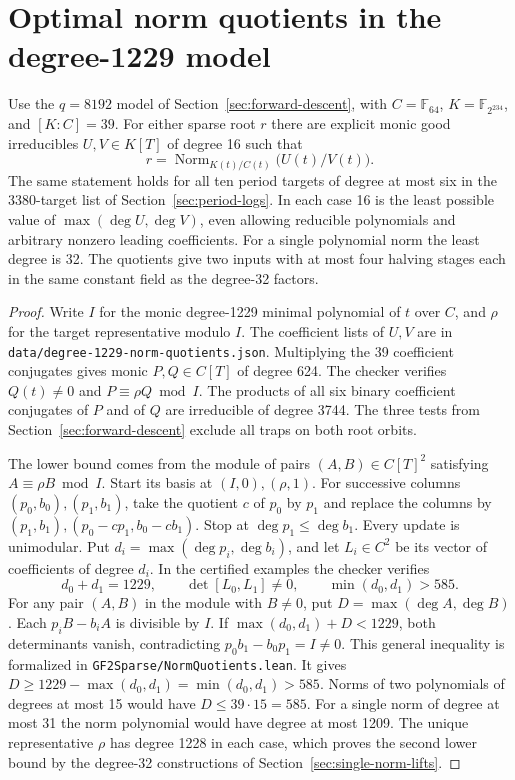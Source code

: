 \documentclass[11pt]{article}
\begin{document}
\section{Optimal norm quotients in the degree-1229 model}\label{sec:norm-quotients}
Use the \(q=8192\) model of Section~\ref{sec:forward-descent}, with
\(C=\mathbb F_{64}\), \(K=\mathbb F_{2^{234}}\), and \([K:C]=39\).
For either sparse root \(r\) there are explicit monic good irreducibles
\(U,V\in K[T]\) of degree 16 such that
\[
              r=\operatorname{Norm}_{K(t)/C(t)}\bigl(U(t)/V(t)\bigr).
\]
The same statement holds for all ten period targets of degree at most six
in the 3380-target list of Section~\ref{sec:period-logs}.
In each case 16 is the least possible value of
\(\max(\deg U,\deg V)\), even allowing reducible polynomials and arbitrary
nonzero leading coefficients. For a single polynomial norm the least
degree is 32. The quotients give two inputs with at most four halving
stages each in the same constant field as the degree-32 factors.

\begin{proof}
Write \(I\) for the monic degree-1229 minimal polynomial of \(t\) over
\(C\), and \(\rho\) for the target representative modulo \(I\).
The coefficient lists of \(U,V\) are in
\nolinkurl{data/degree-1229-norm-quotients.json}. Multiplying the
39 coefficient conjugates gives monic \(P,Q\in C[T]\) of degree 624.
The checker verifies \(Q(t)\ne0\) and \(P\equiv\rho Q\bmod I\).
The products of all six binary coefficient conjugates of \(P\) and of
\(Q\) are irreducible of degree 3744. The three tests from
Section~\ref{sec:forward-descent} exclude all traps on both root orbits.

The lower bound comes from the module of pairs
\((A,B)\in C[T]^2\) satisfying \(A\equiv\rho B\bmod I\).
Start its basis at \((I,0),(\rho,1)\). For successive columns
\((p_0,b_0),(p_1,b_1)\), take the quotient \(c\) of \(p_0\) by \(p_1\)
and replace the columns by
\((p_1,b_1),(p_0-cp_1,b_0-cb_1)\). Stop at
\(\deg p_1\le\deg b_1\). Every update is unimodular.
Put \(d_i=\max(\deg p_i,\deg b_i)\), and let \(L_i\in C^2\)
be its vector of coefficients of degree \(d_i\). In the certified
examples the checker verifies
\[
  d_0+d_1=1229,\qquad \det[L_0,L_1]\ne0,\qquad
  \min(d_0,d_1)>585.
\]
For any pair \((A,B)\) in the module with \(B\ne0\), put
\(D=\max(\deg A,\deg B)\). Each \(p_iB-b_iA\) is divisible by \(I\).
If \(\max(d_0,d_1)+D<1229\), both determinants vanish, contradicting
\(p_0b_1-b_0p_1=I\ne0\). This general inequality is formalized in
\nolinkurl{GF2Sparse/NormQuotients.lean}. It gives
\(D\ge1229-\max(d_0,d_1)=\min(d_0,d_1)>585\).
Norms of two polynomials of degrees at most 15 would have
\(D\le39\cdot15=585\).
For a single norm of degree at most 31 the norm polynomial would have
degree at most 1209. The unique representative \(\rho\) has degree
1228 in each case, which proves the second lower bound by the
degree-32 constructions of Section~\ref{sec:single-norm-lifts}.
\end{proof}
\end{document}
